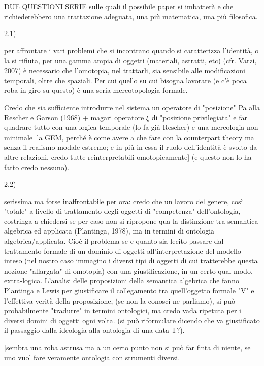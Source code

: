 \documentclass{amsart}
\begin{document}
\section{}
DUE QUESTIONI SERIE sulle quali il possibile paper si imbatterà e che richiederebbero una trattazione adeguata, una più matematica, una più filosofica.

2.1)

per affrontare i vari problemi che si incontrano quando si caratterizza l'identità, o la si rifiuta, per una gamma ampia di oggetti (materiali, astratti, etc) (cfr. Varzi, 2007) è necessario che l'omotopia, nel trattarli, sia sensibile alle modificazioni temporali, oltre che spaziali. Per cui quello su cui bisogna lavorare (e c'è poca roba in giro su questo) è una seria mereotopologia formale. 

Credo che sia sufficiente introdurre nel sistema un operatore di "posizione" Pa alla Rescher e Garson (1968) + magari operatore $\xi$ di "posizione privilegiata" e far quadrare tutto con una logica temporale (lo fa già Rescher) e una mereologia non minimale [la GEM, perché è come avere a che fare con la counterpart theory ma senza il realismo modale estremo; e in più in essa il ruolo dell'identità è svolto da altre relazioni, credo tutte reinterpretabili omotopicamente] (e questo non lo ha fatto credo nessuno).

2.2)

serissima ma forse inaffrontabile per ora: credo che un lavoro del genere, così "totale" a livello di trattamento degli oggetti di "competenza" dell'ontologia, costringa a chiedersi se per caso non si ripropone qua la distinzione tra semantica algebrica ed applicata (Plantinga, 1978), ma in termini di ontologia algebrica/applicata. Cioè il problema se e quanto sia lecito passare dal trattamento formale di un dominio di oggetti all'interpretazione del modello inteso (nel nostro caso immagino i diversi tipi di oggetti di cui tratterebbe questa nozione "allargata" di omotopia) con una giustificazione, in un certo qual modo, extra-logica. L'analisi delle proposizioni della semantica algebrica che fanno Plantinga e Lewis per giustificare il collegamento tra quell'oggetto formale "V" e l'effettiva verità della proposizione, (se non la conosci ne parliamo), si può probabilmente "tradurre" in termini ontologici, ma credo vada ripetuta per i diversi domini di oggetti ogni volta. (si può riformulare dicendo che va giustificato il passaggio dalla ideologia alla ontologia di una data T?).

[sembra una roba astrusa ma a un certo punto non  si può far finta di niente, se uno vuol fare veramente ontologia con strumenti diversi.
\end{document}

